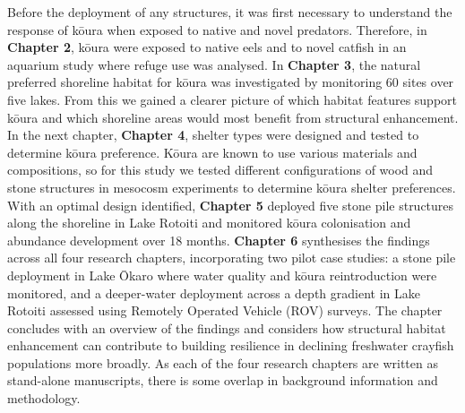 \documentclass[
  12pt,
  a4paper,
  oneside]{scrbook}
\begin{document}
Before the deployment of any structures, it was first necessary to
understand the response of kōura when exposed to native and novel
predators. Therefore, in \textbf{Chapter 2}, kōura were exposed to
native eels and to novel catfish in an aquarium study where refuge use
was analysed. In \textbf{Chapter 3}, the natural preferred shoreline
habitat for kōura was investigated by monitoring 60 sites over five
lakes. From this we gained a clearer picture of which habitat features
support kōura and which shoreline areas would most benefit from
structural enhancement. In the next chapter, \textbf{Chapter 4}, shelter
types were designed and tested to determine kōura preference. Kōura are
known to use various materials and compositions, so for this study we
tested different configurations of wood and stone structures in mesocosm
experiments to determine kōura shelter preferences. With an optimal
design identified, \textbf{Chapter 5} deployed five stone pile
structures along the shoreline in Lake Rotoiti and monitored kōura
colonisation and abundance development over 18 months. \textbf{Chapter
6} synthesises the findings across all four research chapters,
incorporating two pilot case studies: a stone pile deployment in Lake
Ōkaro where water quality and kōura reintroduction were monitored, and a
deeper-water deployment across a depth gradient in Lake Rotoiti assessed
using Remotely Operated Vehicle (ROV) surveys. The chapter concludes
with an overview of the findings and considers how structural habitat
enhancement can contribute to building resilience in declining
freshwater crayfish populations more broadly. As each of the four
research chapters are written as stand-alone manuscripts, there is some
overlap in background information and methodology.
\end{document}

